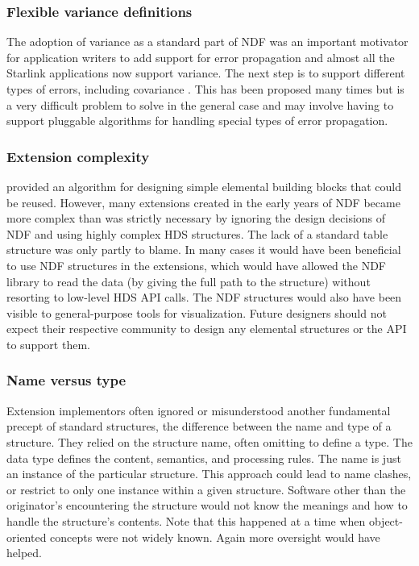 \documentclass[final,authoryear,5p,times,twocolumn]{elsarticle}
\begin{document}
\subsubsection{Flexible variance definitions}

The adoption of variance as a standard part of NDF was an important
motivator for application writers to add support for error propagation and
almost all the Starlink applications now support variance. The next
step is to support different types of errors, including
covariance \citep[see e.g.][]{1992ESOC...41...47M}. This has been proposed many times \citep[see
e.g.][]{1991STARB...8...19M} but is a very difficult problem to solve
in the general case and may involve having to support pluggable
algorithms for handling special types of error propagation.

\subsubsection{Extension complexity}

\citet{SGP38} provided an algorithm for designing simple elemental
building blocks that could be reused. However, many extensions created
in the early years of NDF became more complex than was strictly
necessary by ignoring the design decisions of NDF and using highly
complex HDS structures.  The lack of a standard table structure was
only partly to blame.  In many cases it would have been beneficial to
use NDF structures in the extensions, which would have allowed the NDF
library to read the data (by giving the full path to the structure)
without resorting to low-level HDS API calls.  The NDF structures
would also have been visible to general-purpose tools for
visualization. Future designers should not expect their respective
community to design any elemental structures or the API to support
them.

\subsubsection{Name versus type}

Extension implementors often ignored or misunderstood another
fundamental precept of standard structures, the difference between the
name and type of a structure.  They relied on the structure name,
often omitting to define a type.  The data type defines the content,
semantics, and processing rules.  The name is just an instance of the
particular structure.  This approach could lead to name clashes, or
restrict to only one instance within a given structure.  Software
other than the originator's encountering the structure would not know
the meanings and how to handle the structure's contents.  Note that
this happened at a time when object-oriented concepts were not widely
known.  Again more oversight would have helped.
\end{document}
